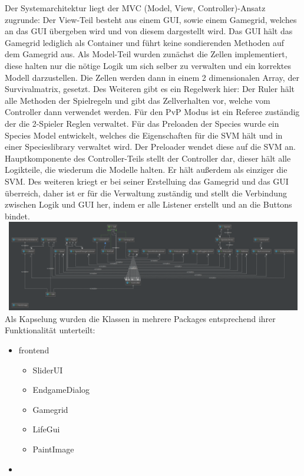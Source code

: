 \documentclass[12pt]{article}
\theoremstyle{plain}
\begin{document}
\begin{linenumbers}
Der Systemarchitektur liegt der MVC (Model, View, Controller)-Ansatz zugrunde:
Der View-Teil besteht aus einem GUI, sowie einem Gamegrid, welches an das GUI übergeben wird und von diesem dargestellt wird.
Das GUI hält das Gamegrid lediglich als Container und führt keine sondierenden Methoden auf dem Gamegrid aus.
Als Model-Teil wurden zunächst die Zellen implementiert, diese halten nur die nötige Logik um sich selber zu verwalten und ein korrektes Modell darzustellen. Die Zellen werden dann in einem 2 dimensionalen Array, der Survivalmatrix, gesetzt. Des Weiteren gibt es ein Regelwerk hier: Der Ruler hält alle Methoden der Spielregeln und gibt das Zellverhalten vor, welche vom Controller dann verwendet werden. Für den PvP Modus ist ein Referee zuständig der die 2-Spieler Reglen verwaltet. Für das Preloaden der Species wurde ein Species Model entwickelt, welches die Eigenschaften für die SVM hält und in einer Specieslibrary verwaltet wird. Der Preloader wendet diese auf die SVM an.
Hauptkomponente des Controller-Teils stellt der Controller dar, dieser hält alle Logikteile, die wiederum die Modelle halten. Er hält außerdem als einziger die SVM.
Des weiteren kriegt er bei seiner Erstelluing das Gamegrid und das GUI überreich, daher ist er für die Verwaltung zuständig und stellt die Verbindung zwischen Logik und GUI her, indem er alle Listener erstellt und an die Buttons bindet.
\newline
\includegraphics[width=1\textwidth, height=150px]{images/gogolClasses.png}
\newline
Als Kapselung wurden die Klassen in mehrere Packages entsprechend ihrer Funktionalität unterteilt:
\begin{itemize}
\item
frontend
\begin{itemize}
\item
SliderUI
\item
EndgameDialog
\item
Gamegrid
\item
LifeGui
\item
PaintImage
\end{itemize}
\item

\end{itemize}
\end{linenumbers}
\end{document}
